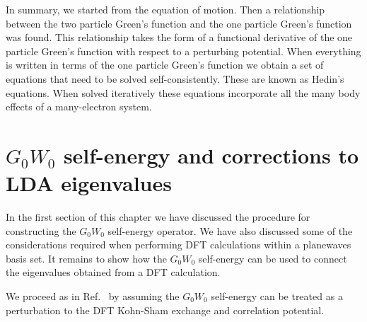 In summary, we started from the equation of motion. Then a relationship between
the two particle Green's function and the one particle Green's function was found.
This relationship takes the form of a functional derivative of the one particle Green's function with
respect to a perturbing potential. When everything is written in terms 
of the one particle Green's function we obtain a set of equations 
that need to be solved self-consistently. These are known as Hedin's equations. 
When solved iteratively these equations incorporate all the many body 
effects of a many-electron system.

\section{$G_0W_0$ self-energy and corrections to LDA eigenvalues}
\noindent
In the first section of this chapter we have discussed the
procedure for constructing the $G_0W_0$ self-energy operator.
We have also discussed some of the considerations required when
performing DFT calculations within a planewaves basis set.
It remains to show how the $G_0W_0$ self-energy can be
used to connect the eigenvalues obtained from a DFT calculation.

We proceed as in Ref.~\cite{HL86} by assuming the $G_0W_0$
self-energy can be treated as a perturbation to the
DFT Kohn-Sham exchange and correlation potential.

